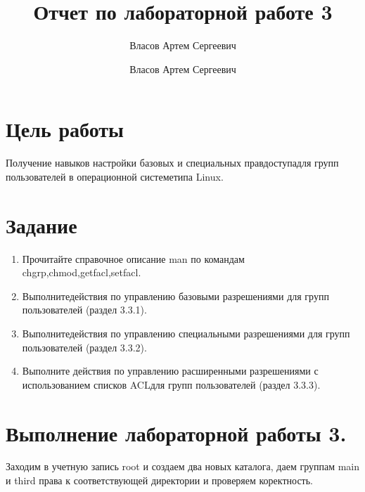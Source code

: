 \documentclass[
  12pt,
  a4paper,
  DIV=11,
  numbers=noendperiod]{scrreprt}
\title{Отчет по лабораторной работе 3}
\subtitle{Власов Артем Сергеевич}
\author{Власов Артем Сергеевич}
\date{}
\providecommand{\tightlist}{%
  \setlength{\itemsep}{0pt}\setlength{\parskip}{0pt}}\usepackage{longtable,booktabs,array}
\renewcommand*\contentsname{Содержание}
\newcommand\contentsname{Содержание}
\begin{document}
\maketitle

\renewcommand*\contentsname{Содержание}
{
\setcounter{tocdepth}{1}
\tableofcontents
}
\listoffigures
\listoftables
{}
\chapter{Цель
работы}\label{ux446ux435ux43bux44c-ux440ux430ux431ux43eux442ux44b}

Получение навыков настройки базовых и специальных правдоступадля групп
пользователей в операционной системетипа Linux.

\chapter{Задание}\label{ux437ux430ux434ux430ux43dux438ux435}

\begin{enumerate}
\def\labelenumi{\arabic{enumi}.}
\tightlist
\item
  Прочитайте справочное описание man по командам
  chgrp,chmod,getfacl,setfacl.
\item
  Выполнитедействия по управлению базовыми разрешениями для групп
  пользователей (раздел 3.3.1).
\item
  Выполнитедействия по управлению специальными разрешениями для групп
  пользователей (раздел 3.3.2).
\item
  Выполните действия по управлению расширенными разрешениями с
  использованием списков ACLдля групп пользователей (раздел 3.3.3).
\end{enumerate}

\chapter{Выполнение лабораторной работы
3.}\label{ux432ux44bux43fux43eux43bux43dux435ux43dux438ux435-ux43bux430ux431ux43eux440ux430ux442ux43eux440ux43dux43eux439-ux440ux430ux431ux43eux442ux44b-3.}

Заходим в учетную запись root и создаем два новых каталога, даем группам
main и third права к соответствующей директории и проверяем коректность.
\end{document}
